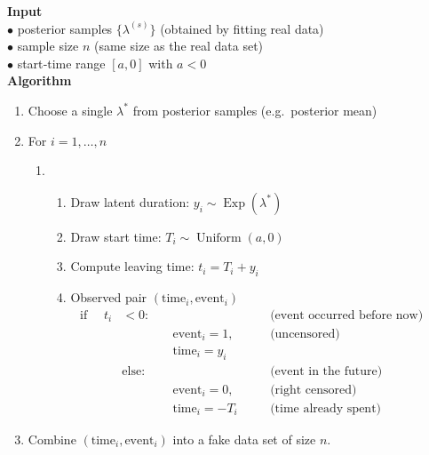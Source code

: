 \begin{tcolorbox}[
  title  = Algorithm: Simulating a Fake Survival Dataset (e.g.Posterior predictive model checking),
   fonttitle  = \small, 
  colback = white,
  colframe=black]
\textbf{Input}\\
\quad$\bullet$ posterior samples $\{\lambda^{(s)}\}$ \hfill (obtained by fitting real data)\\
\quad$\bullet$ sample size $n$ \hfill (same size as the real data set)\\
\quad$\bullet$ start‑time range $[a,0]$ with $a<0$ \\[6pt]
\textbf{Algorithm}\par
\begin{enumerate}
  \item Choose a single $\lambda^\ast$ from posterior samples \hfill (e.g.\ posterior mean)
  \item For $i = 1,\dots,n$
        \begin{enumerate}
          \item[] \hspace*{-10pt}%
          \begin{minipage}[t]{\linewidth}
          \begin{enumerate}
            \item Draw latent duration: $y_i \sim \operatorname{Exp}(\lambda^\ast)$
            \item Draw start time: $T_i \sim \operatorname{Uniform}(a,0)$
            \item Compute leaving time: $t_i = T_i + y_i$
            \item Observed pair $(\text{time}_i,\text{event}_i)$
                  \[\begin{aligned}
\text{if } \quad t_i &< 0: &&&\text{(event occurred before now)}\\
  &&\quad  \text{event}_i=1, &&\text{(uncensored)}\\ 
  &&\quad \text{time}_i=y_i
   &\quad \\
&\text{else}: &&&\text{(event in the future)}\\
   &&\quad \text{event}_i=0, &&\text{(right censored)}\\ 
   &&\quad \text{time}_i=-T_i &&\text{(time already spent)}
   &\quad 
\end{aligned}\]
          \end{enumerate}
          \end{minipage}
        \end{enumerate}
  \item Combine $(\text{time}_i,\text{event}_i)$ into a fake data set of size $n$.
\end{enumerate}
\end{tcolorbox}

